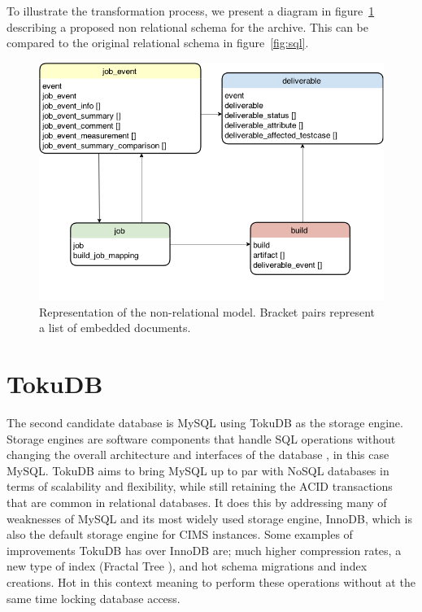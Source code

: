 To illustrate the transformation process, we present a diagram in figure~\ref{fig:nosql} describing a proposed non relational schema for the archive. This can be compared to the original relational schema in figure~\ref{fig:sql}.

\begin{figure}[h!]
\centering
\includegraphics[scale=0.5]{figure/nosql.png}
\caption{Representation of the non-relational model. Bracket pairs represent a list of embedded documents.}
\label{fig:nosql}
\end{figure}

\section{TokuDB}
The second candidate database is MySQL using TokuDB \cite{tokudb} as the storage engine. Storage engines are software components that handle SQL operations without changing the overall architecture and interfaces of the database \cite{storageengine}, in this case MySQL. TokuDB aims to bring MySQL up to par with NoSQL databases in terms of scalability and flexibility, while still retaining the ACID transactions that are common in relational databases. It does this by addressing many of weaknesses of MySQL and its most widely used storage engine, InnoDB, which is also the default storage engine for CIMS instances. Some examples of improvements TokuDB has over InnoDB are; much higher compression rates, a new type of index (Fractal Tree \cite{fractaltree}), and hot schema migrations and index creations. Hot in this context meaning to perform these operations without at the same time locking database access.

